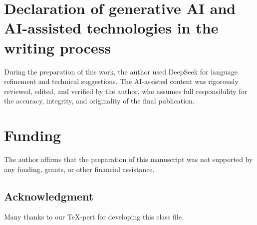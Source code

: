 \documentclass{birkjour}
\theoremstyle{definition}
\theoremstyle{remark}
\numberwithin{equation}{section}
\begin{document}
\section*{Declaration of generative AI and AI-assisted technologies in the writing process}
During the preparation of this work, the author used DeepSeek for language refinement and technical suggestions. The AI-assisted content was rigorously reviewed, edited, and verified by the author, who assumes full responsibility for the accuracy, integrity, and originality of the final publication.\\
\section*{Funding}
The author affirms that the preparation of this manuscript was not supported by any funding, grants, or other financial assistance.  


\subsection*{Acknowledgment}
Many thanks to our \TeX-pert for developing this class file.
\end{document}
